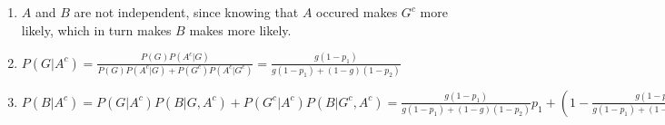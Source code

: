 \begin{enumerate}[label=(\alph*)]

\item $A$ and $B$ are not independent, since knowing that $A$ occured makes $G^
{c}$ more likely, which in turn makes $B$ makes more likely.

\item $P(G|A^{c}) = \frac{P(G)P(A^{c}|G)}{P(G)P(A^{c}|G) + P(G^{c})P(A^{c}|G^
{c})} = \frac{g(1-p_{1})}{g(1-p_{1}) + (1-g)(1-p_{2})}$

\item $P(B|A^{c}) = P(G|A^{c})P(B|G, A^{c}) + P(G^{c}|A^{c})P(B|G^{c}, A^{c}) = 
\frac{g(1-p_{1})}{g(1-p_{1}) + (1-g)(1-p_{2})}p_{1} + 
(1 - \frac{g(1-p_{1})}{g(1-p_{1}) + (1-g)(1-p_{2})})p_{2}$

\end{enumerate}